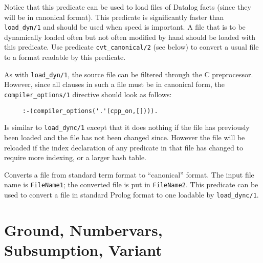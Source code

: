 \begin{description}
    Notice that this predicate can be used to load files of Datalog facts
    (since they will be in canonical format).  This predicate is
    significantly faster than {\tt load\_dyn/1} and should be used when
    speed is important.  A file that is to be dynamically loaded often but
    not often modified by hand should be loaded with this predicate.  Use
    predicate {\tt cvt\_canonical/2} (see below) to convert a usual file
    to a format readable by this predicate.

    As with \verb|load_dyn/1|, the source file can be filtered through the C
    preprocessor. However, since all clauses in such a file must be in
    canonical form, the \verb|compiler_options/1| directive should look as
    follows:
    \begin{verbatim}
     :-(compiler_options('.'(cpp_on,[]))).      
    \end{verbatim}

    Is similar to {\tt load\_dync/1} except that it does nothing if the
    file has previously been loaded and the file has not been changed
    since.  However the file will be reloaded if the index declaration of
    any predicate in that file has changed to require more indexing, or a
    larger hash table.

    Converts a file from standard term format to ``canonical'' format.
    The input file name is {\tt FileName1}; the converted file is put in
    {\tt FileName2}.  This predicate can be used to convert a file in
    standard Prolog format to one loadable by {\tt load\_dync/1}.
\end{description}



\section{Ground, Numbervars, Subsumption, Variant} \label{NumberVars}

